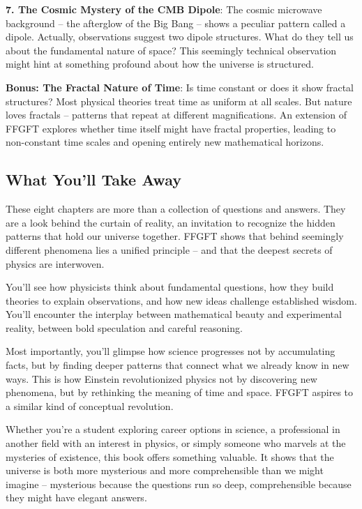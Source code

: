 \documentclass[11pt,openright,twoside]{book}
\begin{document}
\textbf{7. The Cosmic Mystery of the CMB Dipole}: The cosmic microwave background – the afterglow of the Big Bang – shows a peculiar pattern called a dipole. Actually, observations suggest two dipole structures. What do they tell us about the fundamental nature of space? This seemingly technical observation might hint at something profound about how the universe is structured.

\textbf{Bonus: The Fractal Nature of Time}: Is time constant or does it show fractal structures? Most physical theories treat time as uniform at all scales. But nature loves fractals – patterns that repeat at different magnifications. An extension of FFGFT explores whether time itself might have fractal properties, leading to non-constant time scales and opening entirely new mathematical horizons.

\subsection*{What You'll Take Away}

These eight chapters are more than a collection of questions and answers. They are a look behind the curtain of reality, an invitation to recognize the hidden patterns that hold our universe together. FFGFT shows that behind seemingly different phenomena lies a unified principle – and that the deepest secrets of physics are interwoven.

You'll see how physicists think about fundamental questions, how they build theories to explain observations, and how new ideas challenge established wisdom. You'll encounter the interplay between mathematical beauty and experimental reality, between bold speculation and careful reasoning.

Most importantly, you'll glimpse how science progresses not by accumulating facts, but by finding deeper patterns that connect what we already know in new ways. This is how Einstein revolutionized physics not by discovering new phenomena, but by rethinking the meaning of time and space. FFGFT aspires to a similar kind of conceptual revolution.

Whether you're a student exploring career options in science, a professional in another field with an interest in physics, or simply someone who marvels at the mysteries of existence, this book offers something valuable. It shows that the universe is both more mysterious and more comprehensible than we might imagine – mysterious because the questions run so deep, comprehensible because they might have elegant answers.
\end{document}
